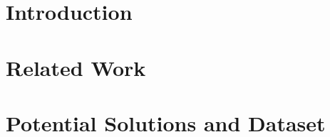 \documentclass[sigconf, nonacm]{acmart}
\begin{document}

\maketitle
\section{Introduction}


\section{Related Work}


\section{Potential Solutions and Dataset}






\end{document}
